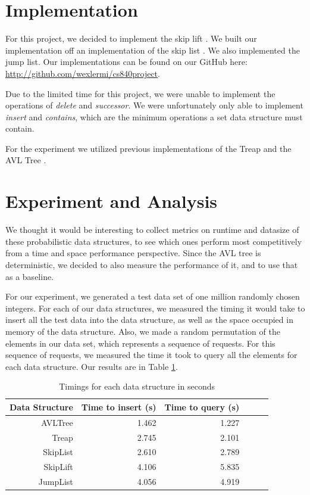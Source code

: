 \documentclass[oribibl]{llncs}
\begin{document}
\section{Implementation}
\label{sctn:implementation}

For this project, we decided to implement the skip lift \cite{skip_lift}. We built our implementation off an implementation of the skip list \cite{skip_list_imp}. We also implemented the jump list\cite{jump_list}.  Our implementations can be found on our GitHub here: \url{http://github.com/wexlermi/cs840project}.

Due to the limited time for this project, we were unable to implement the operations of {\it delete} and {\it successor}. We were unfortunately only able to implement {\it insert} and {\it contains}, which are the minimum operations a set data structure must contain.

For the experiment we utilized previous implementations of the Treap \cite{treap_imp} and the AVL Tree \cite{avl_tree_imp}.

 \section{Experiment and Analysis}
\label{sctn:experiment}

We thought it would be interesting to collect metrics on runtime and datasize of these probabilistic data structures, to see which ones perform most competitively from a time and space performance perspective. Since the AVL tree is deterministic, we decided to also measure the performance of it, and to use that as a baseline.

For our experiment, we generated a test data set of one million randomly chosen integers. For each of our data structures, we measured the timing it would take to insert all the test data into the data structure, as well as the space occupied in memory of the data structure. Also, we made a random permutation of the elements in our data set, which represents a sequence of requests. For this sequence of requests, we measured the time it took to query all the elements for each data structure. Our results are in Table \ref{table:timings}.

\begin{table}[htbp]
\caption{Timings for each data structure in seconds}
\begin{center}
\begin{tabular}{|r|r|r|r|r|r|}
\hline
Data Structure & Time to insert (s) & Time to query (s) \\ \hline
AVLTree & 1.462 & 1.227 \\ \hline
Treap &  2.745 & 2.101 \\ \hline
SkipList & 2.610 & 2.789 \\ \hline
SkipLift & 4.106 & 5.835  \\ \hline
JumpList & 4.056 & 4.919 \\ \hline
\end{tabular}
\end{center}
\label{table:timings}
\end{table}
\end{document}
